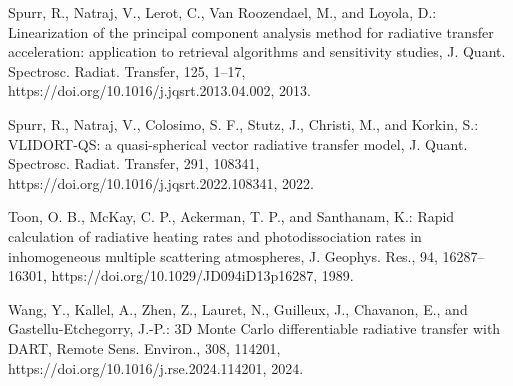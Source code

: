 \documentclass[gmd, manuscript]{copernicus}
\begin{document}
\begin{thebibliography}{}
Spurr, R., Natraj, V., Lerot, C., Van Roozendael, M., and Loyola, D.:
Linearization of the principal component analysis method for radiative transfer
acceleration: application to retrieval algorithms and sensitivity studies, J.
Quant. Spectrosc. Radiat. Transfer, 125, 1--17,
https://doi.org/10.1016/j.jqsrt.2013.04.002,
2013.

Spurr, R., Natraj, V., Colosimo, S. F., Stutz, J., Christi, M., and Korkin, S.:
VLIDORT-QS: a quasi-spherical vector radiative transfer model, J. Quant.
Spectrosc. Radiat. Transfer, 291, 108341,
https://doi.org/10.1016/j.jqsrt.2022.108341, 2022.

Toon, O. B., McKay, C. P., Ackerman, T. P., and Santhanam, K.: Rapid
calculation of radiative heating rates and photodissociation rates in
inhomogeneous multiple scattering atmospheres, J. Geophys. Res., 94,
16287--16301, https://doi.org/10.1029/JD094iD13p16287, 1989.

Wang, Y., Kallel, A., Zhen, Z., Lauret, N., Guilleux, J., Chavanon, E., and
Gastellu-Etchegorry, J.-P.: 3D Monte Carlo differentiable radiative transfer
with DART, Remote Sens. Environ., 308, 114201,
https://doi.org/10.1016/j.rse.2024.114201, 2024.

\end{thebibliography}
\endgroup
\end{document}
